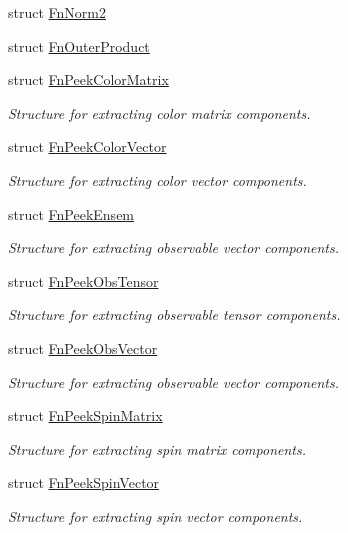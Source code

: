 \begin{DoxyCompactItemize}
\item 
struct \mbox{\hyperlink{structENSEM_1_1FnNorm2}{Fn\+Norm2}}
\item 
struct \mbox{\hyperlink{structENSEM_1_1FnOuterProduct}{Fn\+Outer\+Product}}
\item 
struct \mbox{\hyperlink{structENSEM_1_1FnPeekColorMatrix}{Fn\+Peek\+Color\+Matrix}}
\begin{DoxyCompactList}\small\item\em Structure for extracting color matrix components. \end{DoxyCompactList}\item 
struct \mbox{\hyperlink{structENSEM_1_1FnPeekColorVector}{Fn\+Peek\+Color\+Vector}}
\begin{DoxyCompactList}\small\item\em Structure for extracting color vector components. \end{DoxyCompactList}\item 
struct \mbox{\hyperlink{structENSEM_1_1FnPeekEnsem}{Fn\+Peek\+Ensem}}
\begin{DoxyCompactList}\small\item\em Structure for extracting observable vector components. \end{DoxyCompactList}\item 
struct \mbox{\hyperlink{structENSEM_1_1FnPeekObsTensor}{Fn\+Peek\+Obs\+Tensor}}
\begin{DoxyCompactList}\small\item\em Structure for extracting observable tensor components. \end{DoxyCompactList}\item 
struct \mbox{\hyperlink{structENSEM_1_1FnPeekObsVector}{Fn\+Peek\+Obs\+Vector}}
\begin{DoxyCompactList}\small\item\em Structure for extracting observable vector components. \end{DoxyCompactList}\item 
struct \mbox{\hyperlink{structENSEM_1_1FnPeekSpinMatrix}{Fn\+Peek\+Spin\+Matrix}}
\begin{DoxyCompactList}\small\item\em Structure for extracting spin matrix components. \end{DoxyCompactList}\item 
struct \mbox{\hyperlink{structENSEM_1_1FnPeekSpinVector}{Fn\+Peek\+Spin\+Vector}}
\begin{DoxyCompactList}\small\item\em Structure for extracting spin vector components. \end{DoxyCompactList}\item 

\end{DoxyCompactItemize}
